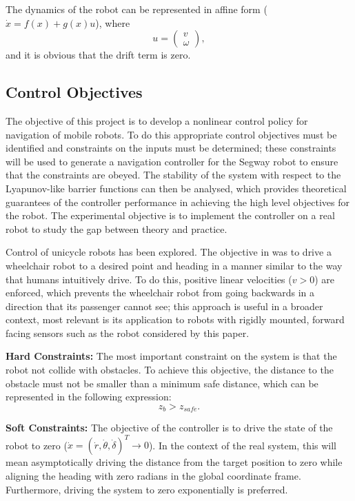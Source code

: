 \documentclass[journal]{IEEEtran}
\begin{document}
The dynamics of the robot can be represented in affine form ($\dot{x}=f(x)+g(x)u$), where $$u=\left(\begin{matrix}
v\\\omega \end{matrix}\right),$$ and it is obvious that the drift term is zero. 

\subsection{Control Objectives}
The objective of this project is to develop a nonlinear control policy for navigation of mobile robots. To do this appropriate control objectives must be identified and constraints on the inputs must be determined; these constraints will be used to generate a navigation controller for the Segway robot to ensure that the constraints are obeyed. The stability of the system with respect to the Lyapunov-like barrier functions can then be analysed, which provides theoretical guarantees of the controller performance in achieving the high level objectives for the robot. The experimental objective is to implement the controller on a real robot to study the gap between theory and practice.

Control of unicycle robots has been explored. The objective in \cite{park2011} was to drive a wheelchair robot to a desired point and heading in a manner similar to the way that humans intuitively drive. To do this, positive linear velocities ($v>0$) are enforced, which prevents the wheelchair robot from going backwards in a direction that its passenger cannot see; this approach is useful in a broader context, most relevant is its application to robots with rigidly mounted, forward facing sensors such as the robot considered by this paper.

\textbf{Hard Constraints:} The most important constraint on the system is that the robot not collide with obstacles. To achieve this objective, the distance to the obstacle must not be smaller than a minimum safe distance, which can be represented in the following expression:
\begin{equation}
z_b>z_{safe}.
\end{equation}

\textbf{Soft Constraints:} The objective of the controller is to drive the state of the robot to zero ($\dot{x}=(\dot{r},\dot{\theta},\dot{\delta})^T \to 0$). In the context of the real system, this will mean asymptotically driving the distance from the target position to zero while aligning the heading with zero radians in the global coordinate frame. Furthermore, driving the system to zero exponentially is preferred.
\end{document}
